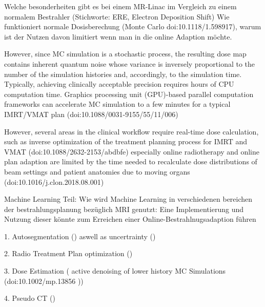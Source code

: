 Welche besonderheiten gibt es bei einem MR-Linac im Vergleich zu einem normalem Bestrahler (Stichworte: ERE, Electron Deposition Shift)
Wie funktioniert normale Dosisberechung (Monte Carlo doi:10.1118/1.598917), warum ist der Nutzen davon limitiert wenn man in die online Adaption möchte. 

However, since MC simulation is a stochastic process, the resulting dose map contains inherent quantum noise whose variance is inversely proportional to the number of the simulation histories and, accordingly, to the simulation time. Typically, achieving clinically acceptable precision requires hours of CPU computation time. Graphics processing unit (GPU)-based parallel computation frameworks can accelerate MC simulation to a few minutes for a typical IMRT/VMAT plan (doi:10.1088/0031-9155/55/11/006)

However, several areas in the clinical workflow require real-time dose calculation, such as inverse optimization of the treatment planning process for IMRT and VMAT (doi:10.1088/2632-2153/abdbfe)
especially online radiotherapy and online plan adaption are limited by the time needed to recalculate dose distributions of beam settings and patient anatomies due to moving organs (doi:10.1016/j.clon.2018.08.001)


Machine Learning Teil: Wie wird Machine Learning in verschiedenen bereichen der bestrahlungsplanung bezüglich MRI genutzt:
Eine Implementierung und Nutzung dieser könnte zum Erreichen einer Online-Bestrahlnugsadaption führen

1. Autosegmentation (\cite{kazemifar_segmentation_2018, liang_deep-learning-based_2019}) aswell as uncertrainty (\cite{shen_medical_2019})

2. Radio Treatment Plan optimization (\cite{fan_automatic_2019, liu_deep_2019})

3. Dose Estimation (\cite{kontaxis_deepdose_2020, bai_deep_2021} active denoising of lower history MC Simulations (doi:10.1002/mp.13856 ))

4. Pseudo CT (\cite{han_mr-based_2017, wolterink_deep_2017, dinkla_mr-only_2018})




